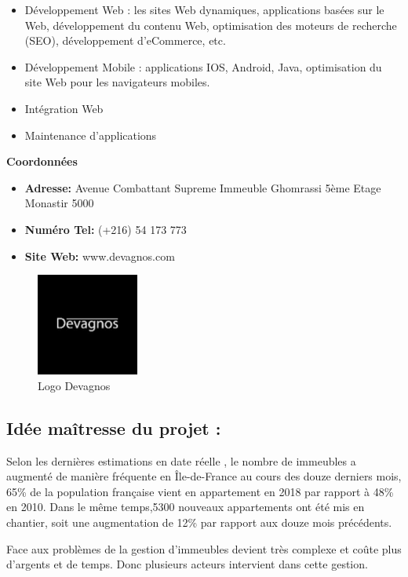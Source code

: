 \documentclass[a4paper,10pt]{book}
\renewcommand{\labelitemi}{$\bullet$}
\begin{document}
 \begin{itemize}
   \renewcommand{\labelitemi}{$\blacktriangleright$}
   \item Développement Web : les sites Web dynamiques, applications basées sur le Web, développement du contenu Web, optimisation des moteurs de recherche (SEO), développement d’eCommerce, etc.
    \item Développement Mobile : applications IOS, Android, Java, optimisation du site Web pour les navigateurs mobiles.
    \item 	Intégration Web
    \item 	Maintenance d'applications
         
   \end{itemize}
\newpage
\textbf{Coordonnées} 
\begin{itemize}
\item \textbf{Adresse:}  Avenue Combattant Supreme  Immeuble Ghomrassi 5ème Etage Monastir 5000
\item \textbf{Numéro Tel:} (+216) 54 173 773
\item \textbf{Site Web:} www.devagnos.com
 \end{itemize}
  \begin{figure}[!h]
  \centering 
\includegraphics[width=0.3\textwidth]{devagnoslogo.jpg}
\caption{Logo Devagnos}
\end{figure}
\subsection{Idée maîtresse du projet :} 
\par  Selon les dernières estimations en date réelle  \cite{einstein} , le nombre de immeubles a augmenté de manière fréquente en Île-de-France au cours des douze derniers mois, 65\% de la population française vient en appartement en 2018 par rapport à 48\% en 2010.
​Dans le même temps,5300 nouveaux appartements ont été mis en chantier, soit une augmentation de 12\% par rapport aux douze mois précédents.



\par  Face aux problèmes de la gestion d'immeubles devient très complexe et coûte plus d'argents et de temps.
Donc plusieurs acteurs intervient dans cette gestion.
\end{document}

